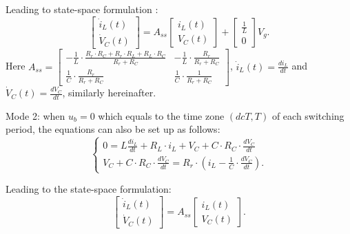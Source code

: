 \documentclass[journal]{IEEEtran}
\begin{document}
Leading to state-space formulation :
\begin{equation}\label{onsol}
\left[ \begin{array}{l}
{{\dot i}_L}(t)\\
{{\dot V}_C}(t)
\end{array} \right] = A_{ss} \left[ \begin{array}{l}
{i_L}(t)\\
{V_C}(t)
\end{array} \right] + \left[ \begin{array}{l}
\frac{1}{L}\\
0
\end{array} \right]{V_g}.
\end{equation}
Here $A_{ss}=\left[ {\begin{array}{*{20}{c}}
	{ - \frac{1}{L} \cdot \frac{{R_r \cdot {R_C} + R_r \cdot {R_L} + {R_L} \cdot {R_C}}}{{R_r + {R_C}}}}&{ - \frac{1}{L} \cdot \frac{R_r}{{R_r + {R_C}}}}\\
	{\frac{1}{C} \cdot \frac{R_r}{{R_r + {R_C}}}}&{\frac{1}{C} \cdot \frac{1}{{R_r + {R_C}}}}
	\end{array}} \right]$,
${{\dot i}_L}(t)=\frac{{d{i_L}}}{{dt}}$ and ${{\dot V}_C}(t)=\frac{{d{V_C}}}{{dt}}$, similarly hereinafter.

Mode 2: when $u_b=0$ which equals to the time zone $(dcT,T)$ of each switching period, the equations can also be set up as follows:
\begin{equation}\label{kvloff}
\left\{ \begin{array}{l}
0 = L\frac{{d{i_L}}}{{dt}} + {R_L} \cdot {i_L} + {V_C} + C \cdot {R_C} \cdot \frac{{d{V_C}}}{{dt}}\\
{V_C} + C \cdot {R_C} \cdot \frac{{d{V_C}}}{{dt}} = R_r \cdot ({i_L} - \frac{1}{C} \cdot \frac{{d{V_C}}}{{dt}}).
\end{array} \right.
\end{equation}

Leading to the state-space formulation:
\begin{equation}\label{soloff}
\left[ \begin{array}{l}
{\dot {i}_L}(t)\\
{{\dot V}_C}(t)
\end{array} \right] =A_{ss}\left[ \begin{array}{l}
{i_L}(t)\\
{V_C}(t)
\end{array} \right].
\end{equation}
\end{document}
